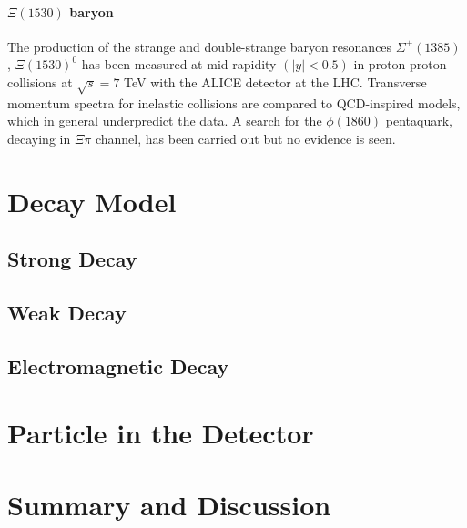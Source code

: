 \documentclass[
10pt, %
a4paper, %
oneside, %
headinclude,footinclude, %
BCOR5mm, %
]{scrartcl}
\begin{document}
\paragraph{$\Xi(1530)$ baryon} The production of the strange and double-strange baryon resonances $\Sigma^{\pm}(1385)$ , $\Xi(1530)^0$ has been measured at mid-rapidity $(|y|< 0.5)$ in proton-proton collisions at $\sqrt{s} = 7$ TeV with the ALICE detector at the LHC. Transverse momentum spectra for inelastic collisions are compared to QCD-inspired models, which in general underpredict the data. A search for the $\phi(1860)$ pentaquark, decaying in $\Xi\pi$ channel, has been carried out but no evidence is seen.\cite{Abelev:1709031}

\section{Decay Model}

\subsection{Strong Decay}

\subsection{Weak Decay}

\subsection{Electromagnetic Decay}


\section{Particle in the Detector}



\section{Summary and Discussion}
\end{document}
